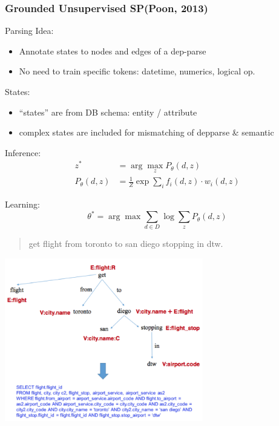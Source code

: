 \documentclass{beamer}
\begin{document}
\begin{frame}
    \frametitle{Grounded Unsupervised SP(Poon, 2013)}

     {
        Parsing Idea:
        \begin{itemize}
            \item Annotate states to nodes and edges of a dep-parse
            \item No need to train specific tokens: datetime, numerics, logical op.
        \end{itemize}

        States:
        \begin{itemize}
            \item ``states'' are from DB schema: entity / attribute
            \item complex states are included for mismatching of depparse \& semantic
        \end{itemize}

        Inference:
        \begin{align*}
            z^* &= \arg\max_z P_\theta(d, z) \\
            P_\theta(d,z) &= \frac{1}{Z}\exp\sum_if_i(d,z)\cdot w_i(d,z)
        \end{align*}

        Learning:
        \[
            \theta^* = \arg\max\sum_{d\in D}\log\sum_zP_\theta(d,z)
        \]
    }

     {
        \begin{quotation}
            get flight from toronto to san diego stopping in dtw.
        \end{quotation}
        \begin{center}
            \includegraphics[width=8.64cm,height=7.12cm]{img/grounded-unsupervised-parse.png}
        \end{center}
    }
\end{frame}
\end{document}
